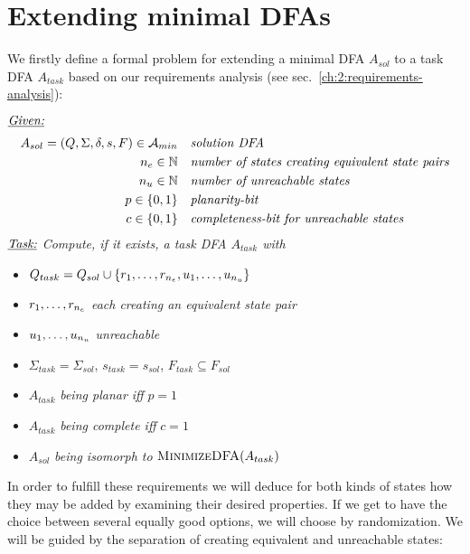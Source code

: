 
\chapter{Extending minimal DFAs} \label{ch:4}

We firstly define a formal problem for extending a minimal DFA $A_{sol}$ to a task DFA $A_{task}$ based on our requirements analysis (see sec.~\ref{ch:2:requirements-analysis}):
\begin{definition}[ExtendMinimalDFA] $ $ \\
	$ $ \vspace{-0.cm} \\
	\noindent $\underline{\emph{Given:}}$
	\vspace{-0.2cm}
	\begin{align*}
	A_{sol} = (Q, \Sigma, \delta, s, F) \in {\mathcal{A}_{min}}\ \ \ & \emph{solution DFA} \\
	{n_e} \in \mathbb{N}\ \ \ & \emph{number of states creating equivalent state pairs} \\
	{n_u} \in \mathbb{N}\ \ \ & \emph{number of unreachable states} \\
	p \in \{0,1\}\ \ \ & \emph{planarity-bit} \\
	c \in \{0,1\}\ \ \ & \emph{completeness-bit for unreachable states}
	\end{align*}
	\noindent $\underline{\emph{Task:}}$ \emph{Compute, if it exists, a task DFA $A_{task}$ with}
	\begin{itemize}
		\item $Q_{task} = Q_{sol} \cup \{ r_1, \ldots, r_{n_e}, u_1, \ldots, u_{n_u} \}$
		\item $r_1, \ldots, r_{n_e}$ \emph{each creating an equivalent state pair}
		\item $u_1, \ldots, u_{n_u}$ \emph{unreachable}
		\item $\Sigma_{task} = \Sigma_{sol}$, $s_{task} = s_{sol}$, $F_{task} \subseteq F_{sol}$
		\item $A_{task}$ \emph{being planar iff} $p = 1$
		\item $A_{task}$ \emph{being complete iff} $c = 1$
		\item $A_{sol}$ \emph{being isomorph to} $\textsc{MinimizeDFA}(A_{task})$
	\end{itemize}
\end{definition}
\noindent In order to fulfill these requirements we will deduce for both kinds of states how they may be added by examining their desired properties. If we get to have the choice between several equally good options, we will choose by randomization. We will be guided by the separation of creating equivalent and unreachable states:
